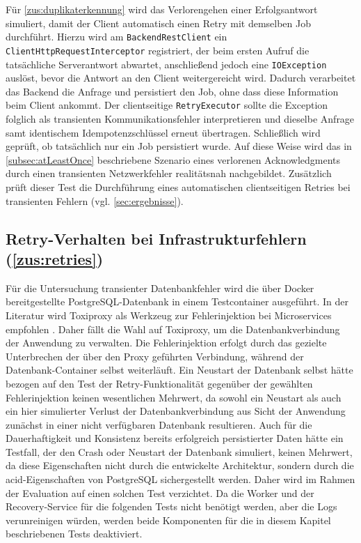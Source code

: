 Für \ref{zus:duplikaterkennung} wird das Verlorengehen einer Erfolgsantwort simuliert, damit der Client automatisch einen
Retry mit demselben Job durchführt.
Hierzu wird am \texttt{BackendRestClient} ein \texttt{ClientHttpRequestInterceptor} registriert, der beim ersten Aufruf die tatsächliche
Serverantwort abwartet, anschließend jedoch eine \texttt{IOException} auslöst, bevor die Antwort an den Client weitergereicht wird.
Dadurch verarbeitet das Backend die Anfrage und persistiert den Job, ohne dass diese Information beim Client ankommt.
Der clientseitige \texttt{RetryExecutor} sollte die Exception folglich als transienten Kommunikationsfehler interpretieren
und dieselbe Anfrage samt identischem Idempotenzschlüssel erneut übertragen.
Schließlich wird geprüft, ob tatsächlich nur ein Job persistiert wurde.
Auf diese Weise wird das in \cref{subsec:atLeastOnce} beschriebene Szenario eines verlorenen Acknowledgments durch
einen transienten Netzwerkfehler realitätsnah nachgebildet.
Zusätzlich prüft dieser Test die Durchführung eines automatischen clientseitigen Retries bei transienten Fehlern (vgl. \cref{sec:ergebnisse}).

\subsection{Retry-Verhalten bei Infrastrukturfehlern (\ref{zus:retries})}
\label{subsec:durchfuehrung_z6}
Für die Untersuchung transienter Datenbankfehler wird die über Docker bereitgestellte PostgreSQL-Datenbank in einem Testcontainer ausgeführt.
In der Literatur wird Toxiproxy als Werkzeug zur Fehlerinjektion bei Microservices empfohlen \parencite{miranda_proposed_2024}.
Daher fällt die Wahl auf Toxiproxy, um die Datenbankverbindung der Anwendung zu verwalten.
Die Fehlerinjektion erfolgt durch das gezielte Unterbrechen der über den Proxy geführten Verbindung, während der
Datenbank-Container selbst weiterläuft.
Ein Neustart der Datenbank selbst hätte bezogen auf den Test der Retry-Funktionalität gegenüber der gewählten Fehlerinjektion keinen
wesentlichen Mehrwert, da sowohl ein Neustart als auch ein hier simulierter Verlust der Datenbankverbindung aus Sicht der
Anwendung zunächst in einer nicht verfügbaren Datenbank resultieren.
Auch für die Dauerhaftigkeit und Konsistenz bereits erfolgreich persistierter Daten hätte ein Testfall, der den Crash oder
Neustart der Datenbank simuliert, keinen Mehrwert, da diese Eigenschaften nicht durch die entwickelte Architektur, sondern
durch die \gls{acid}-Eigenschaften von PostgreSQL sichergestellt werden.
Daher wird im Rahmen der Evaluation auf einen solchen Test verzichtet.
Da die Worker und der Recovery-Service für die folgenden Tests nicht benötigt werden, aber die Logs verunreinigen würden,
werden beide Komponenten für die in diesem Kapitel beschriebenen Tests deaktiviert.

